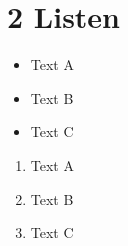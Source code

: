 \documentclass{scrreprt}
\begin{document}
	\chapter{2 Listen}
	
\begin{itemize}
	\item Text A
	\item Text B
	\item Text C
\end{itemize}


\begin{enumerate}
	\item Text A
	\item Text B
	\item Text C
\end{enumerate}



	
	
\end{document}
